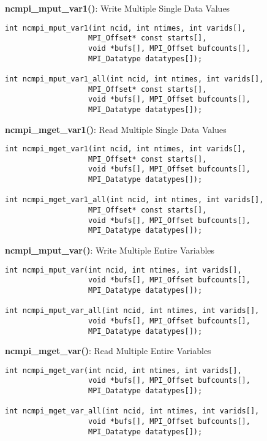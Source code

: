 {\bf ncmpi\_mput\_var1()}: Write Multiple Single Data Values

\begin{verbatim}
int ncmpi_mput_var1(int ncid, int ntimes, int varids[],
                   MPI_Offset* const starts[],
                   void *bufs[], MPI_Offset bufcounts[],
                   MPI_Datatype datatypes[]);

int ncmpi_mput_var1_all(int ncid, int ntimes, int varids[],
                   MPI_Offset* const starts[],
                   void *bufs[], MPI_Offset bufcounts[],
                   MPI_Datatype datatypes[]);
\end{verbatim}


{\bf ncmpi\_mget\_var1()}: Read Multiple Single Data Values

\begin{verbatim}
int ncmpi_mget_var1(int ncid, int ntimes, int varids[],
                   MPI_Offset* const starts[],
                   void *bufs[], MPI_Offset bufcounts[],
                   MPI_Datatype datatypes[]);

int ncmpi_mget_var1_all(int ncid, int ntimes, int varids[],
                   MPI_Offset* const starts[],
                   void *bufs[], MPI_Offset bufcounts[],
                   MPI_Datatype datatypes[]);
\end{verbatim}


{\bf ncmpi\_mput\_var()}: Write Multiple Entire Variables

\begin{verbatim}
int ncmpi_mput_var(int ncid, int ntimes, int varids[],
                   void *bufs[], MPI_Offset bufcounts[],
                   MPI_Datatype datatypes[]);

int ncmpi_mput_var_all(int ncid, int ntimes, int varids[],
                   void *bufs[], MPI_Offset bufcounts[],
                   MPI_Datatype datatypes[]);
\end{verbatim}


{\bf ncmpi\_mget\_var()}: Read Multiple Entire Variables

\begin{verbatim}
int ncmpi_mget_var(int ncid, int ntimes, int varids[],
                   void *bufs[], MPI_Offset bufcounts[],
                   MPI_Datatype datatypes[]);

int ncmpi_mget_var_all(int ncid, int ntimes, int varids[],
                   void *bufs[], MPI_Offset bufcounts[],
                   MPI_Datatype datatypes[]);
\end{verbatim}


